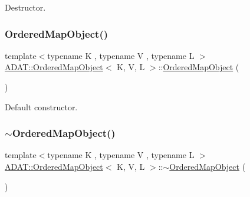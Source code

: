 Destructor. 

\mbox{\label{classADAT_1_1OrderedMapObject_ac9ea7852b3e405d4e0c6744626cb6f24}} 
\subsubsection{\texorpdfstring{OrderedMapObject()}{OrderedMapObject()}\hspace{0.1cm}{\footnotesize\ttfamily [2/2]}}
{\footnotesize\ttfamily template$<$typename K , typename V , typename L $>$ \\
\mbox{\hyperlink{classADAT_1_1OrderedMapObject}{A\+D\+A\+T\+::\+Ordered\+Map\+Object}}$<$ K, V, L $>$\+::\mbox{\hyperlink{classADAT_1_1OrderedMapObject}{Ordered\+Map\+Object}} (\begin{DoxyParamCaption}{ }\end{DoxyParamCaption})\hspace{0.3cm}{\ttfamily [inline]}}



Default constructor. 

\mbox{\label{classADAT_1_1OrderedMapObject_a255777a3e2ecc4482ad8d2adf630a8d2}} 
\subsubsection{\texorpdfstring{$\sim$OrderedMapObject()}{~OrderedMapObject()}\hspace{0.1cm}{\footnotesize\ttfamily [2/2]}}
{\footnotesize\ttfamily template$<$typename K , typename V , typename L $>$ \\
\mbox{\hyperlink{classADAT_1_1OrderedMapObject}{A\+D\+A\+T\+::\+Ordered\+Map\+Object}}$<$ K, V, L $>$\+::$\sim$\mbox{\hyperlink{classADAT_1_1OrderedMapObject}{Ordered\+Map\+Object}} (\begin{DoxyParamCaption}{ }\end{DoxyParamCaption})\hspace{0.3cm}{\ttfamily [inline]}}



